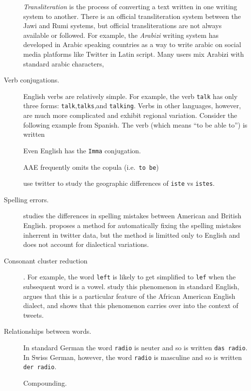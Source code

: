 \documentclass[sigconf,10pt]{acmart}
\newcommand{\str}[1]{\texttt{#1}}
\newcommand{\defn}[1]{\textit{#1}}
\begin{document}
\begin{description}
        \defn{Transliteration} is the process of converting a text written in one writing system to another.
        There is an official transliteration system between the Jawi and Rumi systems,
        but official transliterations are not always available or followed.
        For example, the \defn{Arabizi} writing system has developed in Arabic speaking countries as a way to write arabic on social media platforms like Twitter in Latin script.
        Many users mix Arabizi with standard arabic characters,\citep{bies2014transliteration,tobaili2016arabizi,van2016simple}

    \item[Verb conjugations.]
        English verbs are relatively simple.
        For example, the verb \str{talk} has only three forms:
        \str{talk},\str{talks},and \str{talking}.
        Verbs in other languages, however, 
        are much more complicated and exhibit regional variation.
        Consider the following example from Spanish.
        The verb  (which means ``to be able to'') is written

        Even English has the \str{Imma} conjugation.

        AAE frequently omits the copula (i.e.\ \str{to be}) \citep{pullum1999african} 

        \citet{tinoco2017variation} use twitter to study the geographic differences of \str{iste} vs \str{istes}.

    \item[Spelling errors.]
        \citep{treiman2000dialect} studies the differences in spelling mistakes between American and British English.
        \citet{ahmed2015lexical} proposes a method for automatically fixing the spelling mistakes inherrent in twitter data,
        but the method is limitted only to English and does not account for dialectical variations.
%
    \item[Consonant cluster reduction].
For example, the word \str{left} is likely to get simplified to \str{lef} when the subsequent word is a vowel.
\citet{guy1991contextual,tagliamonte2005new} study this phenomenon in standard English,
\citet{pullum1999african} argues that this is a particular feature of the African American English dialect,
and \citet{eisenstein2013phonological} shows that this phenomenon carries over into the context of tweets.

    \item[Relationships between words.]
        In standard German the word \str{radio} is neuter and so is written \str{das radio}.
        In Swiss German, however, the word \str{radio} is masculine and so is written \str{der radio}. \citep{hollenstein2014compilation}

        Compounding.

\end{description}
\end{document}

